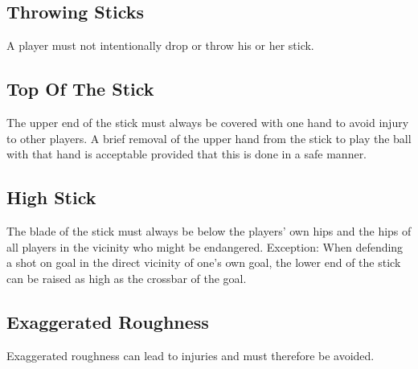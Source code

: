 \subsection{Throwing Sticks}
A player must not intentionally drop or throw his or her stick.

\subsection{Top Of The Stick}
The upper end of the stick must always be covered with one hand to avoid injury to other players.
A brief removal of the upper hand from the stick to play the ball with that hand is acceptable provided that this is done in a safe manner.

\subsection{High Stick \label{subsec:hockey_safety_stick}}
The blade of the stick must always be below the players' own hips and the hips of all players in the vicinity who might be endangered.
Exception: When defending a shot on goal in the direct vicinity of one's own goal, the lower end of the stick can be raised as high as the crossbar of the goal.

\subsection{Exaggerated Roughness}
Exaggerated roughness can lead to injuries and must therefore be avoided.

